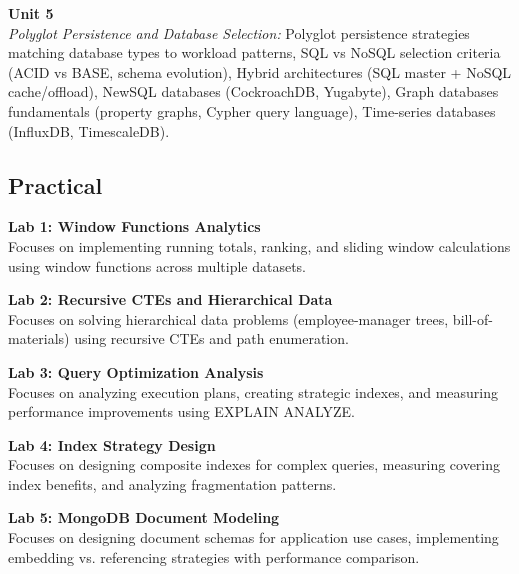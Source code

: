 \vspace{0.3cm}

\noindent\textbf{Unit 5} \\
\textit{Polyglot Persistence and Database Selection:} Polyglot persistence strategies matching database types to workload patterns, SQL vs NoSQL selection criteria (ACID vs BASE, schema evolution), Hybrid architectures (SQL master + NoSQL cache/offload), NewSQL databases (CockroachDB, Yugabyte), Graph databases fundamentals (property graphs, Cypher query language), Time-series databases (InfluxDB, TimescaleDB).

\newpage

\subsection*{Practical}
\noindent\textbf{Lab 1: Window Functions Analytics} \\
Focuses on implementing running totals, ranking, and sliding window calculations using window functions across multiple datasets.

\vspace{0.2cm}

\noindent\textbf{Lab 2: Recursive CTEs and Hierarchical Data} \\
Focuses on solving hierarchical data problems (employee-manager trees, bill-of-materials) using recursive CTEs and path enumeration.

\vspace{0.2cm}

\noindent\textbf{Lab 3: Query Optimization Analysis} \\
Focuses on analyzing execution plans, creating strategic indexes, and measuring performance improvements using EXPLAIN ANALYZE.

\vspace{0.2cm}

\noindent\textbf{Lab 4: Index Strategy Design} \\
Focuses on designing composite indexes for complex queries, measuring covering index benefits, and analyzing fragmentation patterns.

\vspace{0.2cm}

\noindent\textbf{Lab 5: MongoDB Document Modeling} \\
Focuses on designing document schemas for application use cases, implementing embedding vs. referencing strategies with performance comparison.

\vspace{0.2cm}

